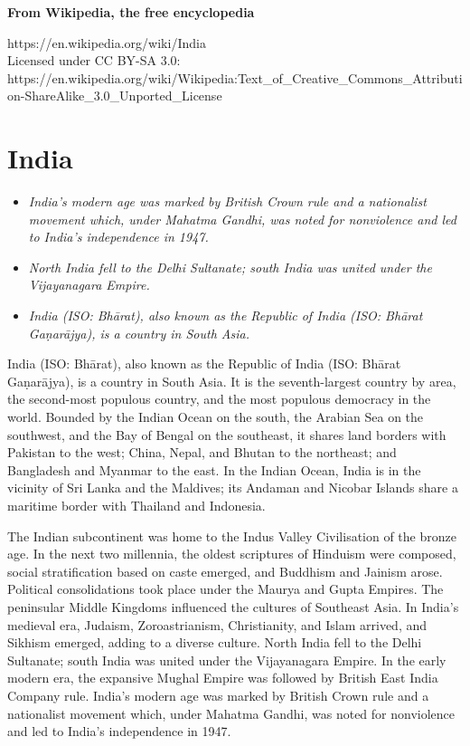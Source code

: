 \textbf{From Wikipedia, the free encyclopedia}

https://en.wikipedia.org/wiki/India\\
Licensed under CC BY-SA 3.0:\\
https://en.wikipedia.org/wiki/Wikipedia:Text\_of\_Creative\_Commons\_Attribution-ShareAlike\_3.0\_Unported\_License

\section{India}\label{india}

\begin{itemize}
\item
  \emph{India's modern age was marked by British Crown rule and a
  nationalist movement which, under Mahatma Gandhi, was noted for
  nonviolence and led to India's independence in 1947.}
\item
  \emph{North India fell to the Delhi Sultanate; south India was united
  under the Vijayanagara Empire.}
\item
  \emph{India (ISO: Bhārat), also known as the Republic of India (ISO:
  Bhārat Gaṇarājya), is a country in South Asia.}
\end{itemize}

India (ISO: Bhārat), also known as the Republic of India (ISO: Bhārat
Gaṇarājya), is a country in South Asia. It is the seventh-largest
country by area, the second-most populous country, and the most populous
democracy in the world. Bounded by the Indian Ocean on the south, the
Arabian Sea on the southwest, and the Bay of Bengal on the southeast, it
shares land borders with Pakistan to the west; China, Nepal, and Bhutan
to the northeast; and Bangladesh and Myanmar to the east. In the Indian
Ocean, India is in the vicinity of Sri Lanka and the Maldives; its
Andaman and Nicobar Islands share a maritime border with Thailand and
Indonesia.

The Indian subcontinent was home to the Indus Valley Civilisation of the
bronze age. In the next two millennia, the oldest scriptures of Hinduism
were composed, social stratification based on caste emerged, and
Buddhism and Jainism arose. Political consolidations took place under
the Maurya and Gupta Empires. The peninsular Middle Kingdoms influenced
the cultures of Southeast Asia. In India's medieval era, Judaism,
Zoroastrianism, Christianity, and Islam arrived, and Sikhism emerged,
adding to a diverse culture. North India fell to the Delhi Sultanate;
south India was united under the Vijayanagara Empire. In the early
modern era, the expansive Mughal Empire was followed by British East
India Company rule. India's modern age was marked by British Crown rule
and a nationalist movement which, under Mahatma Gandhi, was noted for
nonviolence and led to India's independence in 1947.

